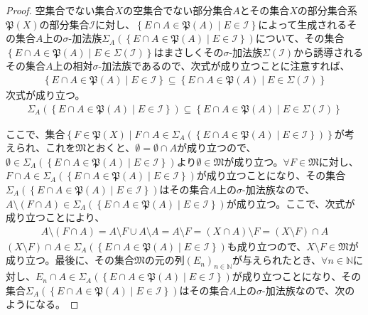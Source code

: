 \documentclass[dvipdfmx]{jsarticle}
\begin{document}
\begin{proof}
空集合でない集合$X$の空集合でない部分集合$A$とその集合$X$の部分集合系$\mathfrak{P}(X)$の部分集合$\mathcal{I}$に対し、$\left\{ E \cap A \in \mathfrak{P}(A) \middle| E\in \mathcal{I} \right\}$によって生成されるその集合$A$上の$\sigma$-加法族$\varSigma_{A}\left( \left\{ E \cap A \in \mathfrak{P}(A) \middle| E\in \mathcal{I} \right\} \right)$について、その集合$\left\{ E \cap A \in \mathfrak{P}(A) \middle| E \in \varSigma\left( \mathcal{I} \right) \right\}$はまさしくその$\sigma$-加法族$\varSigma\left( \mathcal{I} \right)$から誘導されるその集合$A$上の相対$\sigma$-加法族であるので、次式が成り立つことに注意すれば、
\begin{align*}
\left\{ E \cap A \in \mathfrak{P}(A) \middle| E\in \mathcal{I} \right\} \subseteq \left\{ E \cap A \in \mathfrak{P}(A) \middle| E \in \varSigma\left( \mathcal{I} \right) \right\}
\end{align*}
次式が成り立つ。
\begin{align*}
\varSigma_{A}\left( \left\{ E \cap A \in \mathfrak{P}(A) \middle| E\in \mathcal{I} \right\} \right) \subseteq \left\{ E \cap A \in \mathfrak{P}(A) \middle| E \in \varSigma\left( \mathcal{I} \right) \right\}
\end{align*}\par
ここで、集合$\left\{ F \in \mathfrak{P}(X) \middle| F \cap A \in \varSigma_{A}\left( \left\{ E \cap A \in \mathfrak{P}(A) \middle| E\in \mathcal{I} \right\} \right) \right\}$が考えられ、これを$\mathfrak{M}$とおくと、$\emptyset = \emptyset \cap A$が成り立つので、$\emptyset \in \varSigma_{A}\left( \left\{ E \cap A \in \mathfrak{P}(A) \middle| E\in \mathcal{I} \right\} \right)$より$\emptyset \in \mathfrak{M}$が成り立つ。$\forall F \in \mathfrak{M}$に対し、$F \cap A \in \varSigma_{A}\left( \left\{ E \cap A \in \mathfrak{P}(A) \middle| E\in \mathcal{I} \right\} \right)$が成り立つことになり、その集合$\varSigma_{A}\left( \left\{ E \cap A \in \mathfrak{P}(A) \middle| E\in \mathcal{I} \right\} \right)$はその集合$A$上の$\sigma$-加法族なので、$A \setminus (F \cap A) \in \varSigma_{A}\left( \left\{ E \cap A \in \mathfrak{P}(A) \middle| E\in \mathcal{I} \right\} \right)$が成り立つ。ここで、次式が成り立つことにより、
\begin{align*}
A \setminus (F \cap A) = A \setminus F \cup A \setminus A = A \setminus F = (X \cap A) \setminus F = (X \setminus F) \cap A
\end{align*}
$(X \setminus F) \cap A \in \varSigma_{A}\left( \left\{ E \cap A \in \mathfrak{P}(A) \middle| E\in \mathcal{I} \right\} \right)$も成り立つので、$X \setminus F\in \mathfrak{M}$が成り立つ。最後に、その集合$\mathfrak{M}$の元の列$\left( E_{n} \right)_{n \in \mathbb{N}}$が与えられたとき、$\forall n \in \mathbb{N}$に対し、$E_{n} \cap A \in \varSigma_{A}\left( \left\{ E \cap A \in \mathfrak{P}(A) \middle| E\in \mathcal{I} \right\} \right)$が成り立つことになり、その集合$\varSigma_{A}\left( \left\{ E \cap A \in \mathfrak{P}(A) \middle| E\in \mathcal{I} \right\} \right)$はその集合$A$上の$\sigma$-加法族なので、次のようになる。

\end{proof}
\end{document}
